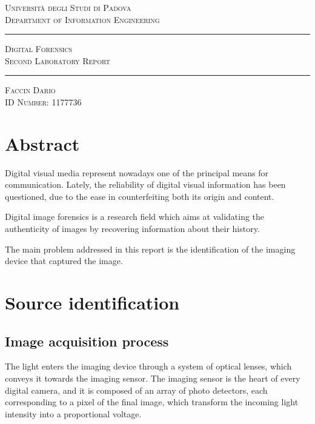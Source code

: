\documentclass[a4paper, 11pt]{article}
\begin{document}
\begin{titlepage}


\vspace*{1cm}

\begin{center}
\large \textsc{Università degli Studi di Padova \\ Department of Information Engineering}

\vspace*{1cm}

\rule{\linewidth}{1pt} \Huge{ \textsc{Digital Forensics}} \\ {\textsc{Second Laboratory Report}} \rule{\linewidth}{2pt}

\vspace*{1cm}

\large \textsc{Faccin Dario} \\
\normalsize \textsc{ID Number: 1177736}

\end{center}

\section*{Abstract}
Digital visual media represent nowadays one of the principal means for communication. Lately, the reliability of digital visual information has been questioned, due to the ease in counterfeiting both its origin and content.

Digital image forensics is a research field which aims at validating the authenticity of images by recovering information about their history.

The main problem addressed in this report is the identification of the
imaging device that captured the image.
\end{titlepage}

\section*{Source identification}
\subsection*{Image acquisition process}
The light enters the imaging device through a system of optical lenses, which conveys it towards the imaging sensor. The imaging sensor is the heart of every digital camera, and it is composed of an array of photo detectors, each corresponding to a pixel of the final image, which transform the incoming light intensity into a proportional voltage.
\end{document}

